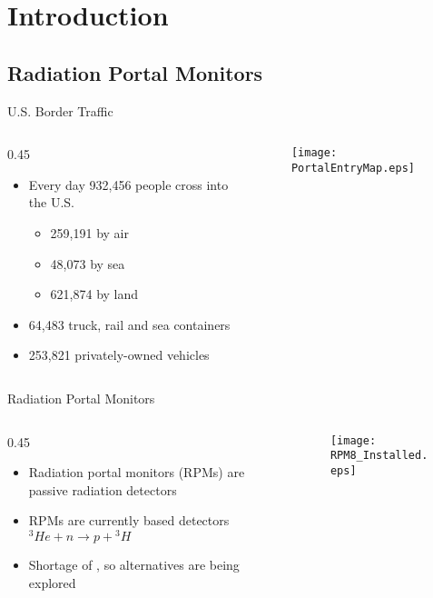 \section{Introduction}

\subsection{Radiation Portal Monitors}

\begin{frame}{U.S. Border Traffic}
\begin{columns}[onlytextwidth]
\begin{column} {0.45\textwidth}
 
  \begin{itemize}
  \item Every day 932,456 people cross into the U.S. \cite{cpb_typical_2012}
    \begin{itemize}
    	\item 259,191 by air
	\item 48,073 by sea
	\item 621,874 by land
    \end{itemize}
  \item 64,483 truck, rail and sea containers \cite{cpb_typical_2012}
 \item 253,821 privately-owned vehicles \cite{cpb_typical_2012}
  \end{itemize}
\end{column}
\begin{column}{0.45\textwidth}
\centering
\begin{figure}
		\texttt{[image: PortalEntryMap.eps]}
\end{figure}
\end{column}
\end{columns}
\end{frame}

\begin{frame}{Radiation Portal Monitors}
\begin{columns}[onlytextwidth]
	\begin{column} {0.45\textwidth}
  	\begin{itemize}
  		\item Radiation portal monitors (RPMs) are passive radiation detectors
  		\item {
  			 RPMs are currently  based detectors
  			\center
    		${}^3He +n \to p +{}^3H$
    	}
  		\item Shortage of , so alternatives are being explored
  		\end{itemize}
	\end{column}
	\begin{column}{0.5\textwidth}
		\centering
		\begin{figure}
			\texttt{[image: RPM8\_Installed.eps]}
			\end{figure}
	\end{column}
\end{columns}
\end{frame}


